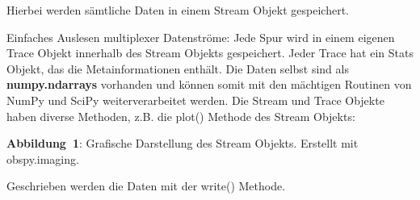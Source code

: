\documentclass[final]{lmuposter}
\begin{document}
\begin{multicols}{2}
{Hierbei werden sämtliche Daten in einem Stream Objekt gespeichert.

Einfaches Auslesen multiplexer Datenströme: Jede Spur wird in einem eigenen Trace Objekt innerhalb des Stream Objekts gespeichert. Jeder Trace hat ein Stats Objekt, das die Metainformationen enthält. Die Daten selbst sind als \textbf{numpy.ndarrays} vorhanden und können somit mit den mächtigen Routinen von NumPy und SciPy weiterverarbeitet werden.
Die Stream und Trace Objekte haben diverse Methoden, z.B. die plot() Methode des Stream Objekts:


\begin{center}
{\newline \small \textbf{Abbildung~1}: Grafische Darstellung des Stream Objekts. Erstellt mit obspy.imaging.
} \\[.5\MyBoxVSep]
\end{center}

\vspace{2ex}
Geschrieben werden die Daten mit der write() Methode.



}\vspace{\MyBoxVSep}

\end{multicols}
\end{document}
